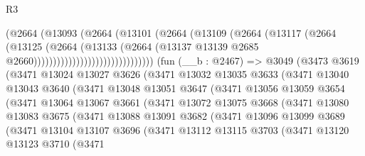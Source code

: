 \begin{lexlean}{R3}
\begin{coremodule}
                                      (@2664
                                        (@13093
                                          (@2664
                                            (@13101
                                              (@2664
                                                (@13109
                                                  (@2664
                                                    (@13117
                                                      (@2664
                                                        (@13125
                                                          (@2664
                                                            (@13133
                                                              (@2664
                                                                (@13137
                                                                  @13139
                                                                  @2685
                                                                  @2660)))))))))))))))))))))))))))))))
    (fun (__b : @2467) =>
    @3049
      (@3473
        @3619
        (@3471
          @13024
          @13027
          @3626
          (@3471
            @13032
            @13035
            @3633
            (@3471
              @13040
              @13043
              @3640
              (@3471
                @13048
                @13051
                @3647
                (@3471
                  @13056
                  @13059
                  @3654
                  (@3471
                    @13064
                    @13067
                    @3661
                    (@3471
                      @13072
                      @13075
                      @3668
                      (@3471
                        @13080
                        @13083
                        @3675
                        (@3471
                          @13088
                          @13091
                          @3682
                          (@3471
                            @13096
                            @13099
                            @3689
                            (@3471
                              @13104
                              @13107
                              @3696
                              (@3471
                                @13112
                                @13115
                                @3703
                                (@3471
                                  @13120
                                  @13123
                                  @3710
                                  (@3471

\end{coremodule}
\end{lexlean}
